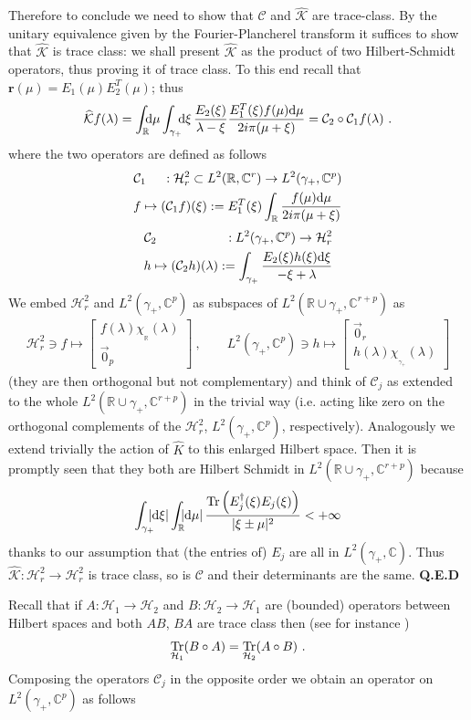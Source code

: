 \documentclass{article}
\def\H{\mathcal H}
\def\r{ {\mathbf r}}
\def \C{{\mathbf C}}
\def \K{{\mathcal K}}
\def\C{{\mathbb C}}
\def\&{&\hspace{-20pt}}
\def\R{{\mathbb R}}
\def\d{{\rm d}}
\def\wh{\widehat}
\def\Tr{\mathop{{\rm Tr}}}
\def\QED{ {\bf Q.E.D}\par \vskip 4pt}
\newcommand{\be}{\begin{eqnarray}}
\newcommand{\ee}{\end{eqnarray}}
\def\le{\left}
\def\ri{\right}
\begin{document}
Therefore to conclude we need to show that $\mathcal C$  and $\wh \K$ are trace-class. By the unitary equivalence given by the Fourier-Plancherel transform it suffices to show that $\wh \K$ is trace class:
we shall present $\wh \K$ as the product of two Hilbert-Schmidt operators, thus proving it of trace class.
To this end recall that $\r(\mu) = E_1(\mu)E_2^T(\mu)$; thus 
\be
\wh \K f (\lambda) =\int_\R\!\!\!\d\mu  \int_{\gamma_+} \!\!\! \d\xi\,  \frac{E_2(\xi)}{\lambda-\xi} \frac {E_1^T (\xi)f(\mu)\d\mu}{2i\pi(\mu+\xi)} = \mathcal C_2\circ \mathcal C_1 f(\lambda)\ .
\ee
where the two operators are defined as follows
\be
\mathcal C_1&\&:\H^2_r \subset L^2(\R,\C^r) \to L^2(\gamma_+,\C^p)\nonumber \\
&\& f\mapsto (\mathcal C_1 f)(\xi):= E_1^T(\xi) \int_{\R} \frac {f(\mu)\d\mu}{2i\pi(\mu + \xi)}\label{C1}
\ee
\be
\mathcal C_2&\& : L^2(\gamma_+,\C^p) \to \H_r^2 \nonumber \\
&\& h\mapsto(\mathcal C_2 h)(\lambda):=  \int_{\gamma_+} \frac {E_2(\xi) h(\xi)\d\xi}{-\xi+\lambda} \label{C2}
\ee
We embed $\H^2_r$ and $L^2(\gamma_+,\C^p)$ as subspaces of $L^2(\R\cup \gamma_+,\C^{r+p})$
as
\be
\H^2_r\ni f \mapsto \le[\begin{array}{c}
f(\lambda)\chi_{_\R}(\lambda)\\ \vec 0_p
\end{array}\ri]\ ,\qquad L^2(\gamma_+,\C^p) \ni h \mapsto \le[\begin{array}{c}
\vec 0_r\\
h(\lambda)\chi_{_{\gamma_+} }(\lambda)
\end{array}\ri]
\ee
 (they are then orthogonal but not complementary) and think of $\mathcal C_j$ as extended to the whole $L^2(\R\cup \gamma_+,\C^{r+p})$ in the trivial way (i.e. acting like zero on the orthogonal complements of the $\H^2_r$, $L^2(\gamma_+, \C^p)$, respectively). Analogously we extend trivially the action of $\wh K$ to this enlarged Hilbert space.
Then it is promptly seen that they both are Hilbert Schmidt  in $L^2(\R\cup \gamma_+,\C^{r+p})$ because
\be
\int_{\gamma_+}\!\!\!\! |\d\xi|\int_{\R}\!\!\!  |\d \mu|\,\frac{\Tr\le( E_j^\dagger(\xi) E_j(\xi)\ri)}{|\xi \pm \mu|^2}<+\infty
\ee
thanks to our assumption that (the entries of) $E_j$ are all in $L^2(\gamma_+,\C)$. Thus $\wh {\mathcal K}: \H^2_r\to \H^2_r$ is trace class, so is $\mathcal C$ and their determinants are the same. \QED 

Recall that  if $A: \H_1\to \H_2$ and $B:\H_2\to \H_1$ are (bounded) operators between Hilbert spaces  and both $AB$, $BA$ are trace class then (see for instance \cite{Si})
\be
\Tr_{\H_1} (B\circ A) = \Tr_{\H_2} (A \circ B)\ .
\ee
Composing the operators $\mathcal C_j$ in the opposite order we obtain an operator on $L^2(\gamma_+,\C^p)$ as follows
\end{document}
